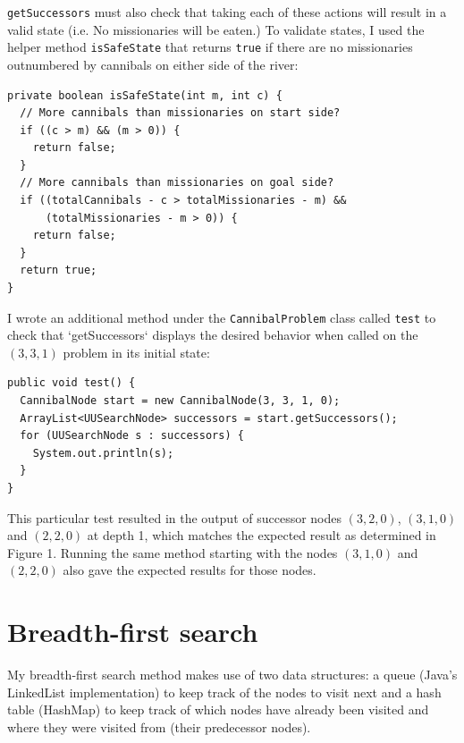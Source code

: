 \documentclass{article}
\begin{document}
\verb`getSuccessors` must also check that taking each of these actions will result in a valid state (i.e. No missionaries will be eaten.) To validate states, I used the helper method \verb`isSafeState` that returns \verb`true` if there are no missionaries outnumbered by cannibals on either side of the river:

 \vspace{10mm}
 
\begin{lstlisting}
private boolean isSafeState(int m, int c) {
  // More cannibals than missionaries on start side?
  if ((c > m) && (m > 0)) {
    return false;
  }
  // More cannibals than missionaries on goal side?
  if ((totalCannibals - c > totalMissionaries - m) && 
      (totalMissionaries - m > 0)) {
    return false;
  }
  return true;
}

\end{lstlisting}

I wrote an additional method under the \verb`CannibalProblem` class called \verb`test` to check that `getSuccessors` displays the desired behavior when called on the $(3, 3, 1)$ problem in its initial state:

\begin{lstlisting}
public void test() {
  CannibalNode start = new CannibalNode(3, 3, 1, 0);
  ArrayList<UUSearchNode> successors = start.getSuccessors();
  for (UUSearchNode s : successors) {
    System.out.println(s);
  }
}
\end{lstlisting}

This particular test resulted in the output of successor nodes $(3, 2, 0)$, $(3, 1, 0)$ and $(2, 2, 0)$ at depth 1, which matches the expected result as determined in Figure 1. Running the same method starting with the nodes $(3, 1, 0)$ and $(2, 2, 0)$ also gave the expected results for those nodes.

\section{Breadth-first search}

My breadth-first search method makes use of two data structures: a queue (Java's LinkedList implementation) to keep track of the nodes to visit next and a hash table (HashMap) to keep track of which nodes have already been visited and where they were visited from (their predecessor nodes).
\end{document}
